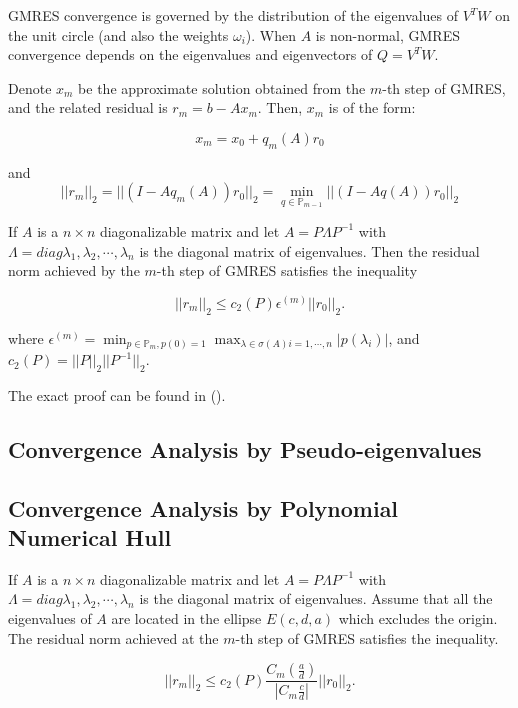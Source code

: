 GMRES convergence is governed by the distribution of the eigenvalues of $V^TW$ on the unit circle (and also the weights $\omega_i$).  When $A$ is non-normal, GMRES convergence depends on the eigenvalues and eigenvectors of $Q=V^TW$.

\begin{theorem}
	Denote $x_m$ be the approximate solution obtained from the $m$-th step of GMRES, and the related residual is $r_m=b-Ax_m$. Then, $x_m$ is of the form:
	
	\begin{equation}
		x_m = x_0 + q_m(A)r_0
	\end{equation}
	
	and 
	\begin{equation}
		||r_m||_2=||(I-Aq_m(A))r_0||_2=\min_{q \in \mathbb{P}_{m-1}}||(I-Aq(A))r_0||_2
	\end{equation}
\end{theorem}

\begin{theorem}
	If $A$ is a $n \times n$ diagonalizable matrix and let $A=P\Lambda P^{-1}$ with $\Lambda=diag{\lambda_1, \lambda_2, \cdots, \lambda_n}$ is the diagonal matrix of eigenvalues. Then the residual norm achieved by the $m$-th step of GMRES satisfies the inequality
	
	\begin{equation}
		||r_m||_2 \leq c_2(P)\epsilon^{(m)}||r_0||_2.
	\end{equation}
\end{theorem}

where $\epsilon^{(m)}=\min_{p \in \mathbb{P}_m, p(0)=1} \max_{\lambda \in \sigma(A)i=1,\cdots,n}|p(\lambda_i)|$, and $c_2(P)=||P||_2||P^{-1}||_2$.

The exact proof can be found in (\cite{saad2003iterative}).

\subsection{Convergence Analysis by Pseudo-eigenvalues}

\subsection{Convergence Analysis by Polynomial Numerical Hull}


\begin{corollary}
	If $A$ is a $n \times n$ diagonalizable matrix and let $A=P\Lambda P^{-1}$ with $\Lambda=diag{\lambda_1, \lambda_2, \cdots, \lambda_n}$ is the diagonal matrix of eigenvalues. Assume that all the eigenvalues of $A$ are located in the ellipse $E(c,d,a)$ which excludes the origin. The residual norm achieved at the $m$-th step of GMRES satisfies the inequality.
	
	\begin{equation}
	||r_m||_2 \leq c_2(P)\frac{C_m(\frac{a}{d})}{|C_m\frac{c}{d}|}||r_0||_2.
	\end{equation}
\end{corollary}

